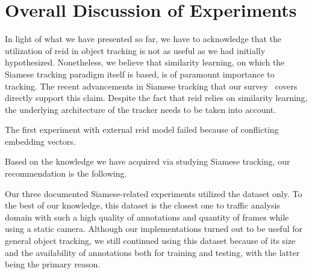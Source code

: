 \section{Overall Discussion of Experiments}
\label{sec:ExperimentsDisucssion}


In light of what we have presented so far, we have to acknowledge that the utilization of \gls{reid} in object tracking is not as useful as we had initially hypothesized. Nonetheless, we believe that similarity learning, on which the Siamese tracking paradigm itself is based, is of paramount importance to tracking. The recent advancements in Siamese tracking that our survey~\cite{ondrasovic2021siamese} covers directly support this claim. Despite the fact that \gls{reid} relies on similarity learning, the underlying architecture of the tracker needs to be taken into account.

The first experiment with external \gls{reid} model failed because of conflicting embedding vectors.

Based on the knowledge we have acquired via studying Siamese tracking, our recommendation is the following.

Our three documented Siamese-related experiments utilized the \uadetrac{} dataset only. To the best of our knowledge, this dataset is the closest one to traffic analysis domain with such a high quality of annotations and quantity of frames while using a static camera. Although our implementations turned out to be useful for general object tracking, we still continued using this dataset because of its size and the availability of annotations both for training and testing, with the latter being the primary reason.

